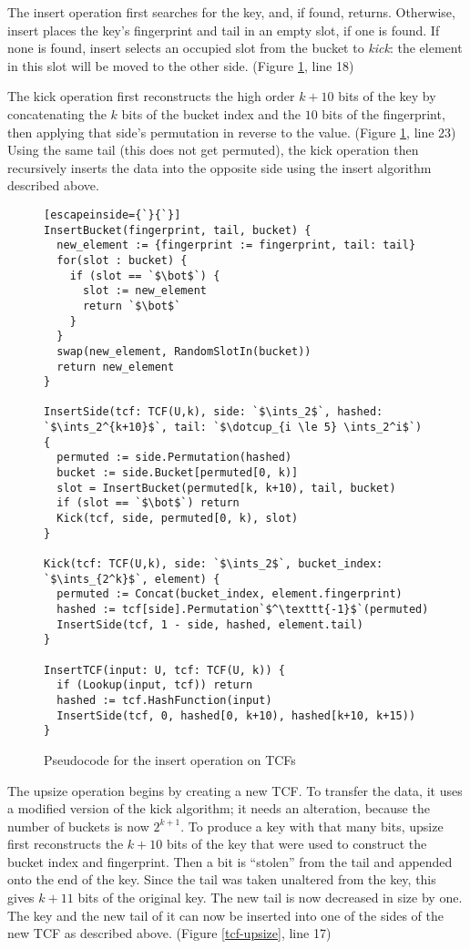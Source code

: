 \documentclass[manuscript,screen,review]{acmart}
\newcommand{\ints}{\mathbb{Z}}
\newcommand{\dotcup}{\ensuremath{\mathaccent\cdot\cup}}
\begin{document}
The insert operation first searches for the key, and, if found, returns.
Otherwise, insert places the key's fingerprint and tail in an empty slot, if one is found.
If none is found, insert selects an occupied slot from the bucket to {\em kick}: the element in this slot will be moved to the other side. (Figure \ref{tcf-insert}, line 18)

The kick operation first reconstructs the high order $k + 10$ bits of the key by concatenating the $k$ bits of the bucket index and the $10$ bits of the fingerprint, then applying that side's permutation in reverse to the value. (Figure \ref{tcf-insert}, line 23)
Using the same tail (this does not get permuted), the kick operation then recursively inserts the data into the opposite side using the insert algorithm described above.

\begin{figure}

\begin{lstlisting}[escapeinside={`}{`}]
InsertBucket(fingerprint, tail, bucket) {
  new_element := {fingerprint := fingerprint, tail: tail}
  for(slot : bucket) {
    if (slot == `$\bot$`) {
      slot := new_element
      return `$\bot$`
    }
  }
  swap(new_element, RandomSlotIn(bucket))
  return new_element
}

InsertSide(tcf: TCF(U,k), side: `$\ints_2$`, hashed: `$\ints_2^{k+10}$`, tail: `$\dotcup_{i \le 5} \ints_2^i$`) {
  permuted := side.Permutation(hashed)
  bucket := side.Bucket[permuted[0, k)]
  slot = InsertBucket(permuted[k, k+10), tail, bucket)
  if (slot == `$\bot$`) return
  Kick(tcf, side, permuted[0, k), slot)
}

Kick(tcf: TCF(U,k), side: `$\ints_2$`, bucket_index: `$\ints_{2^k}$`, element) {
  permuted := Concat(bucket_index, element.fingerprint)
  hashed := tcf[side].Permutation`$^\texttt{-1}$`(permuted)
  InsertSide(tcf, 1 - side, hashed, element.tail)
}

InsertTCF(input: U, tcf: TCF(U, k)) {
  if (Lookup(input, tcf)) return
  hashed := tcf.HashFunction(input)
  InsertSide(tcf, 0, hashed[0, k+10), hashed[k+10, k+15))
}
\end{lstlisting}
\caption{\label{tcf-insert}
Pseudocode for the insert operation on TCFs}
\end{figure}

The upsize operation begins by creating a new TCF.
To transfer the data, it uses a modified version of the kick algorithm; it needs an alteration, because the number of buckets is now $2^{k+1}$.
To produce a key with that many bits, upsize first reconstructs the $k+10$ bits of the key that were used to construct the bucket index and fingerprint.
Then a bit is ``stolen'' from the tail and appended onto the end of the key.
Since the tail was taken unaltered from the key, this gives $k+11$ bits of the original key.
The new tail is now decreased in size by one.
The key and the new tail of it can now be inserted into one of the sides of the new TCF as described above. (Figure \ref{tcf-upsize}, line 17)
\end{document}
